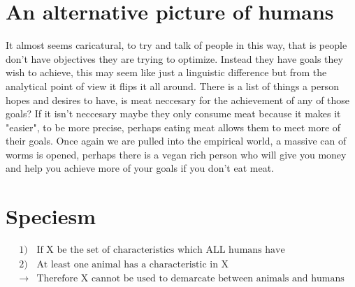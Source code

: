 \documentclass[12pt]{report}
\numberwithin{equation}{section}
\begin{document}
\section{An alternative picture of humans}

It almost seems caricatural, to try and talk of people in this way, that is people don't have objectives they are trying to optimize. Instead they have goals they wish to achieve, this may seem like just a linguistic difference but from the analytical point of view it flips it all around. There is a list of things a person hopes and desires to have, is meat neccesary for the achievement of any of those goals? If it isn't neccesary maybe they only consume meat because it makes it "easier", to be more precise, perhaps eating meat allows them to meet more of their goals. Once again we are pulled into the empirical world, a massive can of worms is opened, perhaps there is a vegan rich person who will give you money and help you achieve more of your goals if you don't eat meat. 



\section{Speciesm}


\begin{tcolorbox}[enhanced,%
  colback=green!25!black!10!white,colframe=green!75!black,title=Fit box (5cm),
  drop fuzzy shadow,watermark color=white,watermark text=Fit]
\begin{align*}
1)& \text{If X be the set of characteristics which ALL humans have} \\
2)& \text{At least one animal has a characteristic in X} \\
\rightarrow& \text{Therefore X cannot be used to demarcate between animals and humans}
\end{align*}
\end{tcolorbox}
\end{document}

